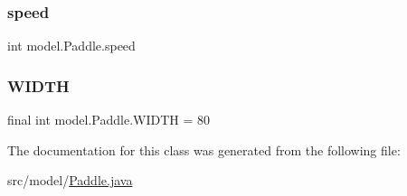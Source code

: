 \hypertarget{classmodel_1_1_paddle_a016b48ba6ccdf1cdfc0c11601a6b2a8e}{}\label{classmodel_1_1_paddle_a016b48ba6ccdf1cdfc0c11601a6b2a8e} 
\subsubsection{\texorpdfstring{speed}{speed}}
{\footnotesize\ttfamily int model.\+Paddle.\+speed\hspace{0.3cm}{\ttfamily [private]}}

\hypertarget{classmodel_1_1_paddle_a960e83432472e421bd4c5fb3c594e93f}{}\label{classmodel_1_1_paddle_a960e83432472e421bd4c5fb3c594e93f} 
\subsubsection{\texorpdfstring{W\+I\+D\+TH}{WIDTH}}
{\footnotesize\ttfamily final int model.\+Paddle.\+W\+I\+D\+TH = 80\hspace{0.3cm}{\ttfamily [private]}}



The documentation for this class was generated from the following file\+:\begin{DoxyCompactItemize}
\item 
src/model/\hyperlink{_paddle_8java}{Paddle.\+java}\end{DoxyCompactItemize}

